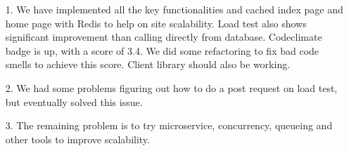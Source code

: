 \documentclass[]{article}
\begin{document}
\begin{enumerate}
	\item[1.]
	We have implemented all the key functionalities and cached index page and home page with Redis to help on site scalability. Load test also shows significant improvement than calling directly from database. Codeclimate badge is up, with a score of 3.4. We did some refactoring to fix bad code smells to achieve this score. Client library should also be working. 
	\item[2.]
	We had some problems figuring out how to do a post request on load test, but eventually solved this issue.
	\item[3.]
	The remaining problem is to try microservice, concurrency, queueing and other tools to improve scalability.
\end{enumerate}
\end{document}
